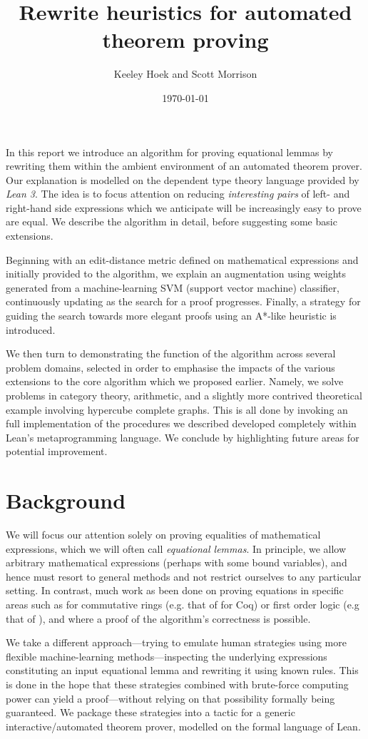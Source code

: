 \documentclass[12pt]{easychair}
\title{Rewrite heuristics for automated theorem proving}
\author{Keeley Hoek and Scott Morrison}
\date{\normalsize \today}
\begin{document}
\noindent

In this report we introduce an algorithm for proving equational lemmas by rewriting them within the ambient environment of an automated theorem prover. Our explanation is modelled on the dependent type theory language provided by \textit{Lean 3}. The idea is to focus attention on reducing \textit{interesting pairs} of left- and right-hand side expressions which we anticipate will be increasingly easy to prove are equal. We describe the algorithm in detail, before suggesting some basic extensions.

Beginning with an edit-distance metric defined on mathematical expressions and initially provided to the algorithm, we explain an augmentation using weights generated from a machine-learning SVM (support vector machine) classifier, continuously updating as the search for a proof progresses. Finally, a strategy for guiding the search towards more elegant proofs using an A*-like heuristic is introduced.

We then turn to demonstrating the function of the algorithm across several problem domains, selected in order to emphasise the impacts of the various extensions to the core algorithm which we proposed earlier. Namely, we solve problems in category theory, arithmetic, and a slightly more contrived theoretical example involving hypercube complete graphs. This is all done by invoking an full implementation of the procedures we described developed completely within Lean's metaprogramming language. We conclude by highlighting future areas for potential improvement.

\section{Background}

We will focus our attention solely on proving equalities of mathematical expressions, which we will often call \textit{equational lemmas}. In principle, we allow arbitrary mathematical expressions (perhaps with some bound variables), and hence must resort to general methods and not restrict ourselves to any particular setting. In contrast, much work as been done on proving equations in specific areas such as for commutative rings (e.g. that of \parencite{gregoire2005proving} for Coq) or first order logic (e.g that of \parencite{bachmair1994rewrite}), and where a proof of the algorithm's correctness is possible.

We take a different approach---trying to emulate human strategies using more flexible machine-learning methods---inspecting the underlying expressions constituting an input equational lemma and rewriting it using known rules. This is done in the hope that these strategies combined with brute-force computing power can yield a proof---without relying on that possibility formally being guaranteed. We package these strategies into a tactic for a generic interactive/automated theorem prover, modelled on the formal language of Lean.
\end{document}
